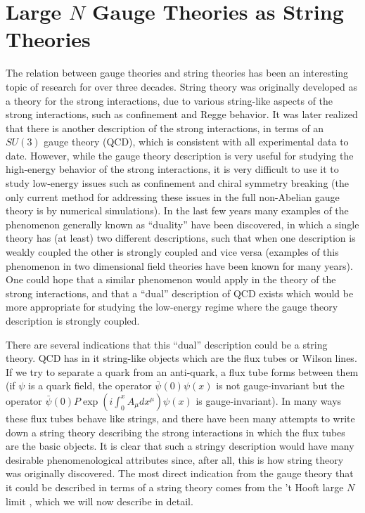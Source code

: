 \section{Large $N$ Gauge Theories as String Theories}
\label{largen}

The relation between gauge theories and string theories has been an
interesting topic of research for over three decades. String theory
was originally developed as a theory for the strong interactions, due
to various string-like aspects of the strong interactions, such as
confinement and Regge behavior. It was later realized that there is
another description of the strong interactions, in terms of an $SU(3)$
gauge theory (QCD), which is consistent with all experimental data to
date. However, while the gauge theory description is very useful for
studying the high-energy behavior of the strong interactions, it is
very difficult to use it to study low-energy issues such as
confinement and chiral symmetry breaking (the only current method for
addressing these issues in the full non-Abelian gauge theory is by
numerical simulations). In the last few years many examples of the
phenomenon generally known as ``duality'' have been discovered, in
which a single theory has (at least) two different descriptions, such
that when one description is weakly coupled the other is strongly
coupled and vice versa (examples of this phenomenon in two dimensional
field theories have been known for many years). One could hope that a
similar phenomenon would apply in the theory of the strong
interactions, and that a ``dual'' description of QCD exists which
would be more appropriate for studying the low-energy regime where the
gauge theory description is strongly coupled.

There are several indications that this ``dual'' description could be
a string theory. QCD has in it string-like objects which are the flux
tubes or Wilson lines. If we try to separate a quark from an
anti-quark, a flux tube forms between them (if $\psi$ is a quark
field, the operator ${\bar \psi}(0) \psi(x)$ is not gauge-invariant
but the operator ${\bar \psi}(0) P\exp(i\int_0^x A_\mu dx^\mu)
\psi(x)$ is gauge-invariant). In many ways these flux tubes behave
like strings, and there have been many attempts to write down a string
theory describing the strong interactions in which the flux tubes are
the basic objects. It is clear that such a stringy description would
have many desirable phenomenological attributes since, after all, this
is how string theory was originally discovered. The most direct
indication from the gauge theory that it could be described in terms
of a string theory comes from the 't Hooft large $N$ limit
\cite{'tHooft:1974jz}, which we will now describe in detail.

